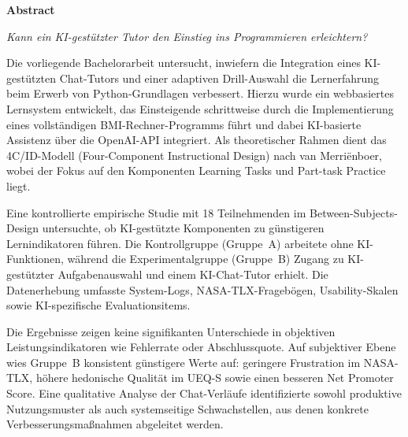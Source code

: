 \clearpage
\setlength{\parskip}{0.5em}

\label{abstract}

\textbf{Abstract}

\textit{Kann ein KI-gestützter Tutor den Einstieg ins Programmieren erleichtern?}


Die vorliegende Bachelorarbeit untersucht, inwiefern die Integration eines KI-gestützten Chat-Tutors und einer adaptiven Drill-Auswahl die Lernerfahrung beim Erwerb von Python-Grundlagen verbessert. Hierzu wurde ein webbasiertes Lernsystem entwickelt, das Einsteigende schrittweise durch die Implementierung eines vollständigen BMI-Rechner-Programms führt und dabei KI-basierte Assistenz über die OpenAI-API integriert. Als theoretischer Rahmen dient das 4C/ID-Modell (Four-Component Instructional Design) nach van Merriënboer, wobei der Fokus auf den Komponenten Learning Tasks und Part-task Practice liegt.

Eine kontrollierte empirische Studie mit 18 Teilnehmenden im Between-Subjects-Design untersuchte, ob KI-gestützte Komponenten zu günstigeren Lernindikatoren führen. Die Kontrollgruppe (Gruppe~A) arbeitete ohne KI-Funktionen, während die Experimentalgruppe (Gruppe~B) Zugang zu KI-gestützter Aufgabenauswahl und einem KI-Chat-Tutor erhielt. Die Datenerhebung umfasste System-Logs, NASA-TLX-Fragebögen, Usability-Skalen sowie KI-spezifische Evaluationsitems.

Die Ergebnisse zeigen keine signifikanten Unterschiede in objektiven Leistungsindikatoren wie Fehlerrate oder Abschlussquote. Auf subjektiver Ebene wies Gruppe~B konsistent günstigere Werte auf: geringere Frustration im NASA-TLX, höhere hedonische Qualität im UEQ-S sowie einen besseren Net Promoter Score. Eine qualitative Analyse der Chat-Verläufe identifizierte sowohl produktive Nutzungsmuster als auch systemseitige Schwachstellen, aus denen konkrete Verbesserungsmaßnahmen abgeleitet werden.

\setlength{\parskip}{0pt}
\clearpage
